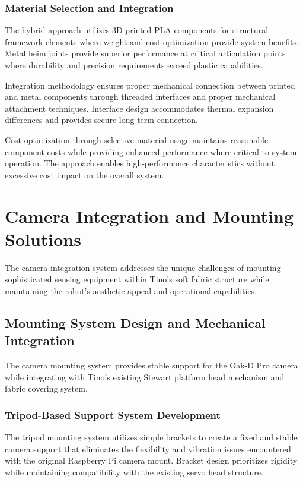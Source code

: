 \subsubsection{Material Selection and Integration}

The hybrid approach utilizes 3D printed PLA components for structural framework elements where weight and cost optimization provide system benefits. Metal heim joints provide superior performance at critical articulation points where durability and precision requirements exceed plastic capabilities.

Integration methodology ensures proper mechanical connection between printed and metal components through threaded interfaces and proper mechanical attachment techniques. Interface design accommodates thermal expansion differences and provides secure long-term connection.

Cost optimization through selective material usage maintains reasonable component costs while providing enhanced performance where critical to system operation. The approach enables high-performance characteristics without excessive cost impact on the overall system.

\section{Camera Integration and Mounting Solutions}

The camera integration system addresses the unique challenges of mounting sophisticated sensing equipment within Tino's soft fabric structure while maintaining the robot's aesthetic appeal and operational capabilities.

\subsection{Mounting System Design and Mechanical Integration}

The camera mounting system provides stable support for the Oak-D Pro camera while integrating with Tino's existing Stewart platform head mechanism and fabric covering system.

\subsubsection{Tripod-Based Support System Development}

The tripod mounting system utilizes simple brackets to create a fixed and stable camera support that eliminates the flexibility and vibration issues encountered with the original Raspberry Pi camera mount. Bracket design prioritizes rigidity while maintaining compatibility with the existing servo head structure.

